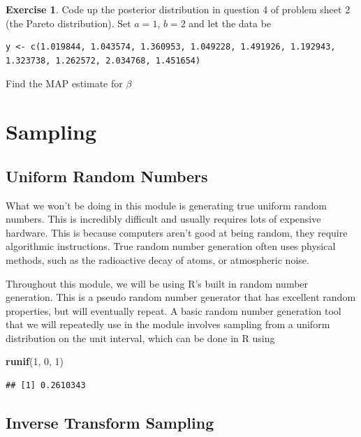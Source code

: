 \documentclass[
]{book}
\newenvironment{Shaded}{\begin{snugshade}}{\end{snugshade}}
\newcommand{\DecValTok}[1]{\textcolor[rgb]{0.00,0.00,0.81}{#1}}
\newcommand{\FunctionTok}[1]{\textcolor[rgb]{0.13,0.29,0.53}{\textbf{#1}}}
\newcommand{\NormalTok}[1]{#1}
\theoremstyle{definition}
\theoremstyle{definition}
\theoremstyle{definition}
\newtheorem{exercise}{Exercise}[chapter]
\theoremstyle{definition}
\theoremstyle{remark}
\begin{document}
\begin{exercise}
Code up the posterior distribution in question 4 of problem sheet 2 (the Pareto distribution). Set \(a = 1\), \(b = 2\) and let the data be

\begin{verbatim}
y <- c(1.019844, 1.043574, 1.360953, 1.049228, 1.491926, 1.192943, 1.323738, 1.262572, 2.034768, 1.451654)
\end{verbatim}

Find the MAP estimate for \(\beta\)
\end{exercise}

\hypertarget{sampling}{%
\chapter{Sampling}\label{sampling}}

\hypertarget{uniform-random-numbers}{%
\section{Uniform Random Numbers}\label{uniform-random-numbers}}

What we won't be doing in this module is generating true uniform random numbers. This is incredibly difficult and usually requires lots of expensive hardware. This is because computers aren't good at being random, they require algorithmic instructions. True random number generation often uses physical methods, such as the radioactive decay of atoms, or atmospheric noise.

Throughout this module, we will be using R's built in random number generation. This is a pseudo random number generator that has excellent random properties, but will eventually repeat. A basic random number generation tool that we will repeatedly use in the module involves sampling from a uniform distribution on the unit interval, which can be done in R using

\begin{Shaded}
\begin{Highlighting}[]
\FunctionTok{runif}\NormalTok{(}\DecValTok{1}\NormalTok{, }\DecValTok{0}\NormalTok{, }\DecValTok{1}\NormalTok{)}
\end{Highlighting}
\end{Shaded}

\begin{verbatim}
## [1] 0.2610343
\end{verbatim}

\hypertarget{inverse-transform-sampling}{%
\section{Inverse Transform Sampling}\label{inverse-transform-sampling}}
\end{document}
